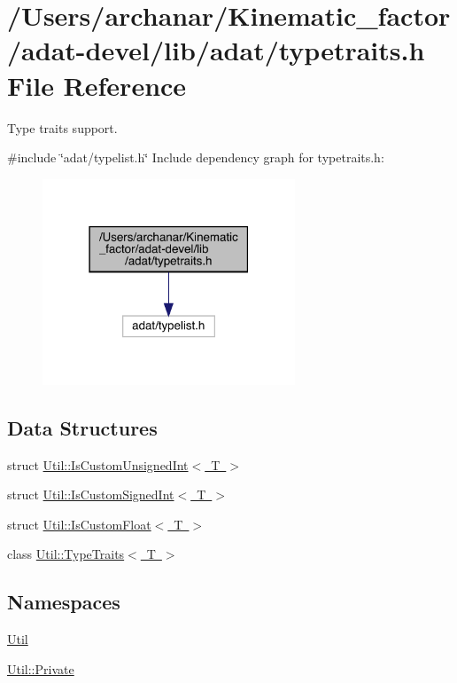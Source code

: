 \hypertarget{adat-devel_2lib_2adat_2typetraits_8h}{}\section{/\+Users/archanar/\+Kinematic\+\_\+factor/adat-\/devel/lib/adat/typetraits.h File Reference}
\label{adat-devel_2lib_2adat_2typetraits_8h}


Type traits support.  


{\ttfamily \#include \char`\"{}adat/typelist.\+h\char`\"{}}\newline
Include dependency graph for typetraits.\+h\+:
\nopagebreak
\begin{figure}[H]
\begin{center}
\leavevmode
\includegraphics[width=214pt]{d7/d6c/adat-devel_2lib_2adat_2typetraits_8h__incl}
\end{center}
\end{figure}
\subsection*{Data Structures}
\begin{DoxyCompactItemize}
\item 
struct \mbox{\hyperlink{structUtil_1_1IsCustomUnsignedInt}{Util\+::\+Is\+Custom\+Unsigned\+Int$<$ T $>$}}
\item 
struct \mbox{\hyperlink{structUtil_1_1IsCustomSignedInt}{Util\+::\+Is\+Custom\+Signed\+Int$<$ T $>$}}
\item 
struct \mbox{\hyperlink{structUtil_1_1IsCustomFloat}{Util\+::\+Is\+Custom\+Float$<$ T $>$}}
\item 
class \mbox{\hyperlink{classUtil_1_1TypeTraits}{Util\+::\+Type\+Traits$<$ T $>$}}
\end{DoxyCompactItemize}
\subsection*{Namespaces}
\begin{DoxyCompactItemize}
\item 
 \mbox{\hyperlink{namespaceUtil}{Util}}
\item 
 \mbox{\hyperlink{namespaceUtil_1_1Private}{Util\+::\+Private}}
\end{DoxyCompactItemize}
